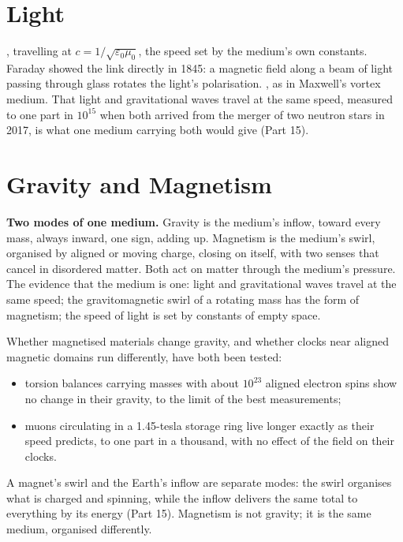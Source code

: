 \documentclass[11pt,a4paper]{article}
\begin{document}
\section{Light}
\label{sec:light}

, travelling at $c=1/\sqrt{\varepsilon_0\mu_0}$, the speed set by the medium's own constants. Faraday showed the link directly in 1845: a magnetic field along a beam of light passing through glass rotates the light's polarisation. , as in Maxwell's vortex medium. That light and gravitational waves travel at the same speed, measured to one part in $10^{15}$ when both arrived from the merger of two neutron stars in 2017, is what one medium carrying both would give (Part 15).

\section{Gravity and Magnetism}
\label{sec:gravity}

\begin{argbar}
\textbf{Two modes of one medium.} Gravity is the medium's inflow, toward every mass, always inward, one sign, adding up. Magnetism is the medium's swirl, organised by aligned or moving charge, closing on itself, with two senses that cancel in disordered matter. Both act on matter through the medium's pressure. The evidence that the medium is one: light and gravitational waves travel at the same speed; the gravitomagnetic swirl of a rotating mass has the form of magnetism; the speed of light is set by constants of empty space.
\end{argbar}

 Whether magnetised materials change gravity, and whether clocks near aligned magnetic domains run differently, have both been tested:
\begin{itemize}
\item torsion balances carrying masses with about $10^{23}$ aligned electron spins show no change in their gravity, to the limit of the best measurements;
\item muons circulating in a 1.45-tesla storage ring live longer exactly as their speed predicts, to one part in a thousand, with no effect of the field on their clocks.
\end{itemize}
A magnet's swirl and the Earth's inflow are separate modes: the swirl organises what is charged and spinning, while the inflow delivers the same total to everything by its energy (Part 15). Magnetism is not gravity; it is the same medium, organised differently.
\end{document}

